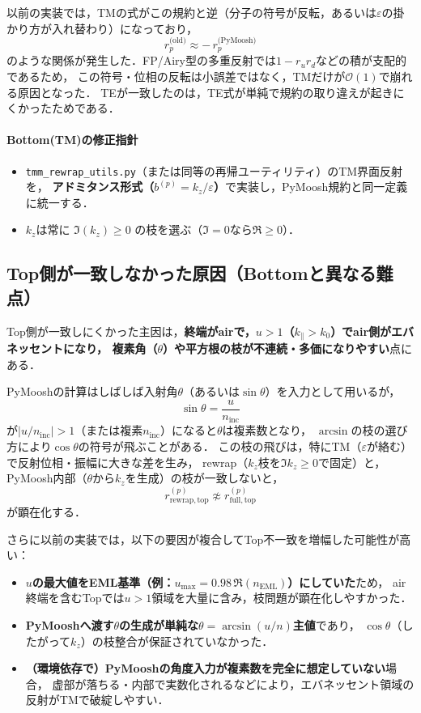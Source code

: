 以前の実装では，TMの式がこの規約と逆（分子の符号が反転，あるいは$\varepsilon$の掛かり方が入れ替わり）になっており，
\[
r_p^{\text{(old)}} \approx -\,r_p^{\text{(PyMoosh)}}
\]
のような関係が発生した．FP/Airy型の多重反射では$1-r_u r_d$などの積が支配的であるため，
この符号・位相の反転は小誤差ではなく，TMだけが$\mathcal{O}(1)$で崩れる原因となった．
TEが一致したのは，TE式が単純で規約の取り違えが起きにくかったためである．

\paragraph{Bottom(TM)の修正指針}
\begin{itemize}
\item \texttt{tmm\_rewrap\_utils.py}（または同等の再帰ユーティリティ）のTM界面反射を，
      \textbf{アドミタンス形式（$b^{(p)}=k_z/\varepsilon$）}で実装し，PyMoosh規約と同一定義に統一する．
\item $k_{z}$は常に $\Im(k_z)\ge 0$ の枝を選ぶ（$\Im=0$なら$\Re\ge 0$）．
\end{itemize}

\subsection{Top側が一致しなかった原因（Bottomと異なる難点）}

Top側が一致しにくかった主因は，\textbf{終端がairで，$u>1$（$k_\parallel>k_0$）でair側がエバネッセントになり，
複素角（$\theta$）や平方根の枝が不連続・多価になりやすい}点にある．

PyMooshの計算はしばしば入射角$\theta$（あるいは$\sin\theta$）を入力として用いるが，
\[
\sin\theta=\frac{u}{n_{\mathrm{inc}}}
\]
が$|u/n_{\mathrm{inc}}|>1$（または複素$n_{\mathrm{inc}}$）になると$\theta$は複素数となり，
$\arcsin$の枝の選び方により$\cos\theta$の符号が飛ぶことがある．
この枝の飛びは，特にTM（$\varepsilon$が絡む）で反射位相・振幅に大きな差を生み，
rewrap（$k_z$枝を$\Im k_z\ge 0$で固定）と，PyMoosh内部（$\theta$から$k_z$を生成）の枝が一致しないと，
\[
r_{\mathrm{rewrap,top}}^{(p)} \not\approx r_{\mathrm{full,top}}^{(p)}
\]
が顕在化する．

さらに以前の実装では，以下の要因が複合してTop不一致を増幅した可能性が高い：
\begin{itemize}
\item \textbf{$u$の最大値をEML基準（例：$u_{\max}=0.98\,\Re(n_{\mathrm{EML}})$）にしていた}ため，
      air終端を含むTopでは$u>1$領域を大量に含み，枝問題が顕在化しやすかった．
\item \textbf{PyMooshへ渡す$\theta$の生成が単純な$\theta=\arcsin(u/n)$主値}であり，
      $\cos\theta$（したがって$k_z$）の枝整合が保証されていなかった．
\item \textbf{（環境依存で）PyMooshの角度入力が複素数を完全に想定していない}場合，
      虚部が落ちる・内部で実数化されるなどにより，エバネッセント領域の反射がTMで破綻しやすい．
\end{itemize}

